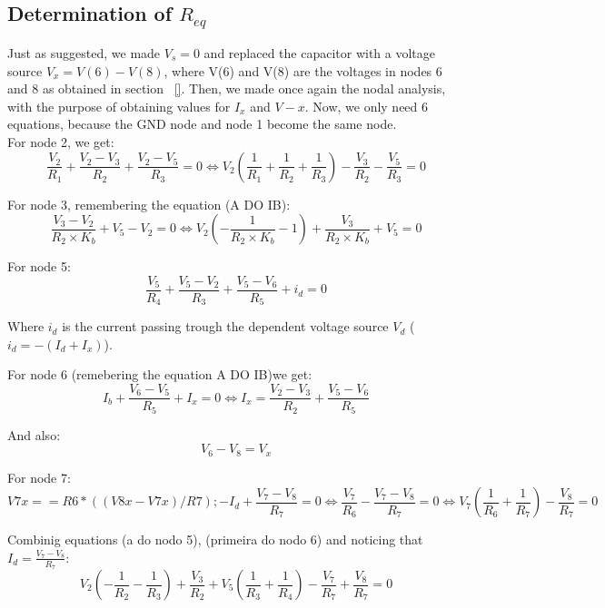 \subsection{Determination of $R_{eq}$}
\label{section:R}
Just as suggested, we made $V_s = 0$ and replaced the capacitor with a voltage source $V_x= V(6)-V(8)$, where V(6) and V(8) are the voltages in nodes 6 and 8 as obtained in section ~\ref{}. Then, we made once again the nodal analysis, with the purpose of obtaining values for $I_x$ and $V-x$. Now, we only need 6 equations, because the GND node and node 1 become the same node.\\
For node 2, we get:
\begin{equation}
\frac{V_2}{R_1} + \frac{V_2 - V_3}{R_2} + \frac{V_2 - V_5}{R_3} = 0 \Leftrightarrow V_2\left( \frac{1}{R_1} + \frac{1}{R_2} + \frac{1}{R_3} \right) - \frac{V_3}{R_2} - \frac{V_5}{R_3}=0
\end{equation}

For node 3, remembering the equation (A DO IB):
\begin{equation}
\frac{V_3 - V_2}{R_2\times K_b }+ V_5 - V_2 = 0 \Leftrightarrow V_2 \left(-\frac{1}{R_2\times K_b} - 1\right) + \frac{V_3}{R_2\times K_b} + V_5 = 0
\end{equation}

For node 5:
\begin{equation}
\frac{V_5}{R_4}+ \frac{V_5-V_2}{R_3} + \frac{V_5-V_6}{R_5} + i_d= 0 
\end{equation}

Where $i_d$ is the current passing trough the dependent voltage source $V_d$ ($i_d = -(I_d + I_x)$).

For node 6 (remebering the equation A DO IB)we get:
\begin{equation}
I_b + \frac{V_6-V_5}{R_5} + I_x = 0 \Leftrightarrow I_x = \frac{V_2-V_3}{R_2} + \frac{V_5-V_6}{R_5}
\end{equation}

And also:
\begin{equation}
V_6-V_8 = V_x
\end{equation}

For node 7:
\begin{equation}
V7x==R6*((V8x - V7x)/R7);
-I_d + \frac{V_7-V_8}{R_7} = 0 \Leftrightarrow \frac{V_7}{R_6} - \frac{V_7-V_8}{R_7} = 0\Leftrightarrow V_7\left(\frac{1}{R_6} + \frac{1}{R_7}\right) - \frac{V_8}{R_7} = 0
\end{equation}

Combinig equations (a do nodo 5), (primeira do nodo 6) and noticing that $I_d = \frac{V_7-V_8}{R_7}$:
\begin{equation}
V_2 \left( -\frac{1}{R_2} - \frac{1}{R_3}\right) + \frac{V_3}{R_2} +  V_5 \left( \frac{1}{R_3} + \frac{1}{R_4}\right) - \frac{V_7}{R_7} + \frac{V_8}{R_7} = 0
\end{equation}

